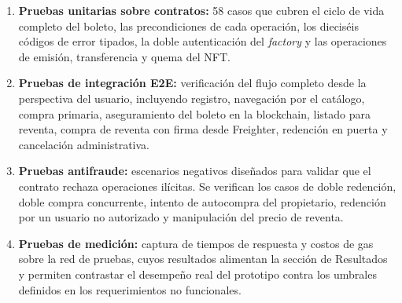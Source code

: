 \begin{enumerate}\setlength{\itemsep}{2pt}
    \item \textbf{Pruebas unitarias sobre contratos:} 58 casos que cubren el ciclo de vida completo del
boleto, las precondiciones de cada operación, los dieciséis códigos de error tipados, la doble autenticación
del \textit{factory} y las operaciones de emisión, transferencia y quema del NFT.

    \item \textbf{Pruebas de integración E2E:} verificación del flujo completo desde la perspectiva del
usuario, incluyendo registro, navegación por el catálogo, compra primaria, aseguramiento del boleto en la
blockchain, listado para reventa, compra de reventa con firma desde Freighter, redención en puerta y
cancelación administrativa.

    \item \textbf{Pruebas antifraude:} escenarios negativos diseñados para validar que el contrato rechaza
operaciones ilícitas. Se verifican los casos de doble redención, doble compra concurrente, intento de
autocompra del propietario, redención por un usuario no autorizado y manipulación del precio de reventa.

    \item \textbf{Pruebas de medición:} captura de tiempos de respuesta y costos de gas sobre la red de
pruebas, cuyos resultados alimentan la sección de Resultados y permiten contrastar el desempeño real del
prototipo contra los umbrales definidos en los requerimientos no funcionales.
\end{enumerate}
